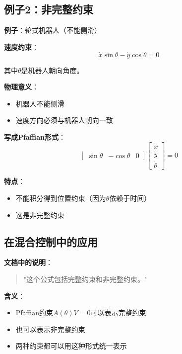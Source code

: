 \documentclass[12pt,a4paper]{article}
\begin{document}
\subsection{例子2：非完整约束}

\textbf{例子}：轮式机器人（不能侧滑）

\textbf{速度约束}：
\begin{equation}
\dot{x}\sin\theta - \dot{y}\cos\theta = 0
\end{equation}

其中$\theta$是机器人朝向角度。

\textbf{物理意义}：
\begin{itemize}
\item 机器人不能侧滑
\item 速度方向必须与机器人朝向一致
\end{itemize}

\textbf{写成Pfaffian形式}：
\begin{equation}
\begin{bmatrix} \sin\theta & -\cos\theta & 0 \end{bmatrix} \begin{bmatrix} \dot{x} \\ \dot{y} \\ \dot{\theta} \end{bmatrix} = 0
\end{equation}

\textbf{特点}：
\begin{itemize}
\item 不能积分得到位置约束（因为$\theta$依赖于时间）
\item 这是非完整约束
\end{itemize}

\subsection{在混合控制中的应用}

\textbf{文档中的说明}：
\begin{quote}
"这个公式包括完整约束和非完整约束。"
\end{quote}

\textbf{含义}：
\begin{itemize}
\item Pfaffian约束$A(\theta)V = 0$可以表示完整约束
\item 也可以表示非完整约束
\item 两种约束都可以用这种形式统一表示
\end{itemize}
\end{document}
